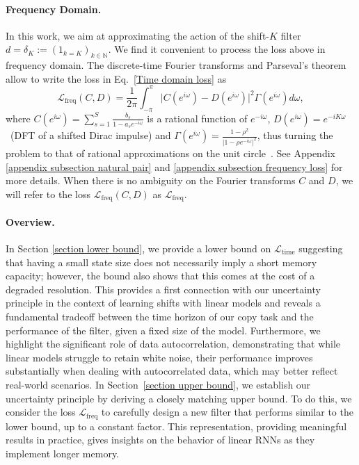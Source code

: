 \paragraph{Frequency Domain.} In this work, we aim at approximating the action of the shift-$K$ filter $d = \delta_{K} := (1_{k = K})_{k\in\mathbb{N}}$. 
We find it convenient to process the loss above in frequency domain. The discrete-time Fourier transforms and Parseval's theorem allow to write the loss in Eq.~\eqref{Time domain loss} as
\begin{equation}
\mathcal{L}_\text{freq}(C, D) = \frac{1}{2\pi}\int_{-\pi}^\pi\vert C(e^{i\omega}) - D(e^{i\omega})\vert^2\Gamma(e^{i\omega})d\omega,
    \label{Frequential loss copy task}
\end{equation}
where $C(e^{i\omega}) = \sum_{s=1}^S\frac{b_s}{1-a_se^{-i\omega}}$ is a rational function of $e^{-i\omega}$, $D(e^{i\omega}) = e^{-iK\omega}$~(DFT of a shifted Dirac impulse) and $\Gamma(e^{i\omega}) = \frac{1-\rho^2}{\vert 1 - \rho e^{-i\omega}\vert^2}$, thus turning the problem to that of rational approximations on the unit circle~\citep{baratchart2016minimax}. See Appendix \ref{appendix subsection natural pair} and \ref{appendix subsection frequency loss} for more details. When there is no ambiguity on the Fourier transforms $C$ and $D$, we will refer to the loss $\mathcal{L}_\text{freq}(C, D)$ as $\mathcal{L}_\text{freq}$.
 


\paragraph{Overview.} In Section \ref{section lower bound}, we provide a lower bound on $\mathcal{L}_{\text{time}}$ suggesting that having a small state size does not necessarily imply a short memory capacity; however, the bound also shows that this comes at the cost of a degraded resolution. This provides a first connection with our uncertainty principle in the context of learning shifts with linear models and reveals a fundamental tradeoff between the time horizon of our copy task and the performance of the filter, given a fixed size of the model. Furthermore, we highlight the significant role of data autocorrelation, demonstrating that while linear models struggle to retain white noise, their performance improves substantially when dealing with autocorrelated data, which may better reflect real-world scenarios.
In Section~\ref{section upper bound}, we establish our uncertainty principle by deriving a closely matching upper bound. To do this, we consider the loss $\mathcal{L}_\text{freq}$ to carefully design a new filter that performs similar to the lower bound, up to a constant factor. This representation, providing meaningful results in practice, gives insights on the behavior of linear RNNs as they implement longer memory.

